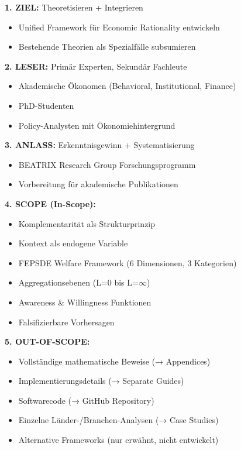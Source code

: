 \documentclass[12pt,a4paper]{article}
\begin{document}
\begin{tcolorbox}[colback=blue!5!white, colframe=blue!75!black, 
    title=EBF Hauptdokument: Vollständige Spezifikation]

\textbf{1. ZIEL:} Theoretisieren + Integrieren
\begin{itemize}[nosep]
\item Unified Framework für Economic Rationality entwickeln
\item Bestehende Theorien als Spezialfälle subsumieren
\end{itemize}

\textbf{2. LESER:} Primär Experten, Sekundär Fachleute
\begin{itemize}[nosep]
\item Akademische Ökonomen (Behavioral, Institutional, Finance)
\item PhD-Studenten
\item Policy-Analysten mit Ökonomiehintergrund
\end{itemize}

\textbf{3. ANLASS:} Erkenntnisgewinn + Systematisierung
\begin{itemize}[nosep]
\item BEATRIX Research Group Forschungsprogramm
\item Vorbereitung für akademische Publikationen
\end{itemize}

\textbf{4. SCOPE (In-Scope):}
\begin{itemize}[nosep]
\item Komplementarität als Strukturprinzip
\item Kontext als endogene Variable
\item FEPSDE Welfare Framework (6 Dimensionen, 3 Kategorien)
\item Aggregationsebenen (L=0 bis L=$\infty$)
\item Awareness \& Willingness Funktionen
\item Falsifizierbare Vorhersagen
\end{itemize}

\textbf{5. OUT-OF-SCOPE:}
\begin{itemize}[nosep]
\item Vollständige mathematische Beweise (→ Appendices)
\item Implementierungsdetails (→ Separate Guides)
\item Softwarecode (→ GitHub Repository)
\item Einzelne Länder-/Branchen-Analysen (→ Case Studies)
\item Alternative Frameworks (nur erwähnt, nicht entwickelt)
\end{itemize}


\end{tcolorbox}
\end{document}
